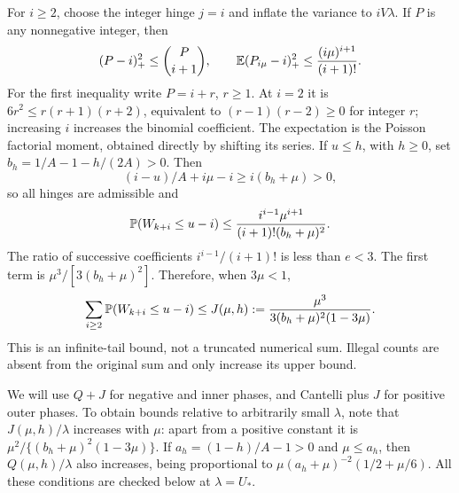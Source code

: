 For $i\ge2$, choose the integer hinge $j=i$ and inflate the variance
to $iV\lambda$. If $P$ is any nonnegative integer, then
\[
 (P-i)_+^2\le\binom{P}{i+1},\qquad
 \mathbb E(P_{i\mu}-i)_+^2\le\frac{(i\mu)^{i+1}}{(i+1)!}.
\]
For the first inequality write $P=i+r$, $r\ge1$. At $i=2$ it is
$6r^2\le r(r+1)(r+2)$, equivalent to $(r-1)(r-2)\ge0$ for integer
$r$; increasing $i$ increases the binomial coefficient. The expectation
is the Poisson factorial moment, obtained directly by shifting its series.
If $u\le h$, with $h\ge0$, set
$b_h=1/A-1-h/(2A)>0$. Then
\[
 (i-u)/A+i\mu-i\ge i(b_h+\mu)>0,
\]
so all hinges are admissible and
\[
 \mathbb P(W_{k+i}\le u-i)\le
    \frac{i^{i-1}\mu^{i+1}}{(i+1)!(b_h+\mu)^2}.
\]
The ratio of successive coefficients $i^{i-1}/(i+1)!$ is less than
$e<3$. The first term is $\mu^3/[3(b_h+\mu)^2]$. Therefore, when
$3\mu<1$,
\begin{equation}\label{v10:moderate:rest}
 \sum_{i\ge2}\mathbb P(W_{k+i}\le u-i)
 \le J(\mu,h):=\frac{\mu^3}{3(b_h+\mu)^2(1-3\mu)}.
\end{equation}
This is an infinite-tail bound, not a truncated numerical sum. Illegal
counts are absent from the original sum and only increase its upper bound.

We will use $Q+J$ for negative and inner phases, and Cantelli plus $J$
for positive outer phases. To obtain bounds relative to arbitrarily small
$\lambda$, note that $J(\mu,h)/\lambda$ increases with $\mu$:
apart from a positive constant it is
$\mu^2/\{(b_h+\mu)^2(1-3\mu)\}$. If
$a_h=(1-h)/A-1>0$ and $\mu\le a_h$, then $Q(\mu,h)/\lambda$
also increases, being proportional to
$\mu(a_h+\mu)^{-2}(1/2+\mu/6)$.
All these conditions are checked below at $\lambda=U_*$.


